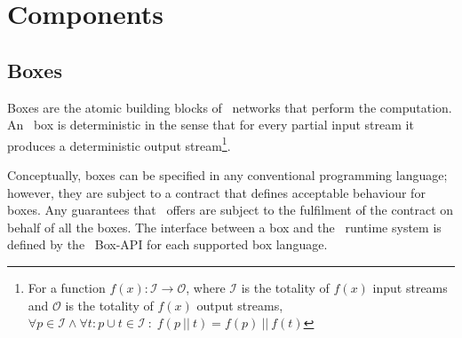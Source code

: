 \section{Components}
    \subsection*{Boxes}
Boxes are the atomic building blocks of \ak\ networks that perform the computation. An \ak\ box is deterministic in the sense that for every partial input stream it produces a deterministic output stream\footnote{For a function $f(x): \mathcal{I} \to \mathcal{O}$, where $\mathcal{I}$ is the totality of $f(x)$ input streams and $\mathcal{O}$ is the totality of $f(x)$ output streams, $\forall p \in \mathcal{I} \land \forall t:p \cup t \in \mathcal{I} \: : \; f(p \:||\: t) = f(p) \:||\: f(t)$}.

Conceptually, boxes can be specified in any conventional programming language; however, they are subject to a contract that defines acceptable behaviour for boxes. Any guarantees that \ak\ offers are subject to the fulfilment of the contract on behalf of all the boxes. The interface between a box and the \ak\ runtime system is defined by the \ak\ Box-API for each supported box language.


